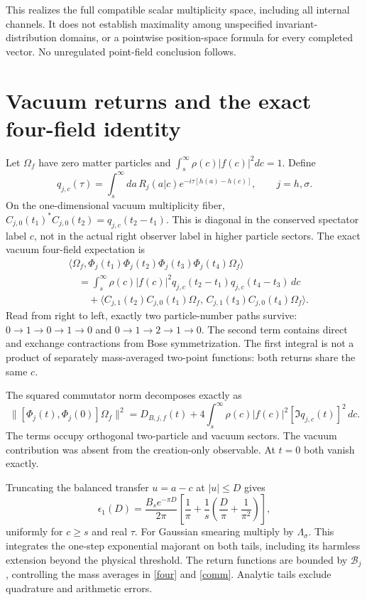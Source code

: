 \documentclass[11pt,a4paper]{article}
\begin{document}
This realizes the full compatible scalar multiplicity space, including
all internal channels. It does not establish maximality among
unspecified invariant-distribution domains, or a pointwise
position-space formula for every completed vector.
No unregulated point-field conclusion follows.

\newpage
\section{Vacuum returns and the exact four-field identity}
Let $\Omega_f$ have zero matter particles and
$\int_s^\infty\rho(c)|f(c)|^2dc=1$.
Define
\begin{equation}
 q_{j,c}(\tau)=\int_s^\infty da\,R_j(a|c)
             e^{-i\tau[h(a)-h(c)]},\qquad j=h,\sigma .
 \label{return}
\end{equation}
On the one-dimensional vacuum multiplicity fiber,
$C_{j,0}(t_1)^*C_{j,0}(t_2)=q_{j,c}(t_2-t_1)$.
This is diagonal in the conserved spectator label $c$, not in the
actual right observer label in higher particle sectors.
The exact vacuum four-field expectation is
\begin{align}
 &\langle\Omega_f,\Phi_j(t_1)\Phi_j(t_2)
                        \Phi_j(t_3)\Phi_j(t_4)\Omega_f\rangle\nonumber\\
 &\quad=\int_s^\infty\rho(c)|f(c)|^2
       q_{j,c}(t_2-t_1)q_{j,c}(t_4-t_3)\,dc\nonumber\\
 &\qquad+
 \langle C_{j,1}(t_2)C_{j,0}(t_1)\Omega_f,\,
         C_{j,1}(t_3)C_{j,0}(t_4)\Omega_f\rangle .
 \label{four}
\end{align}
Read from right to left, exactly two particle-number paths survive:
$0\to1\to0\to1\to0$ and $0\to1\to2\to1\to0$.
The second term contains direct and exchange contractions from Bose
symmetrization. The first integral is not a product of separately
mass-averaged two-point functions: both returns share the same $c$.

The squared commutator norm decomposes exactly as
\begin{equation}
 \|[\Phi_j(t),\Phi_j(0)]\Omega_f\|^2
 =D_{B,j,f}(t)+4\int_s^\infty\rho(c)|f(c)|^2
                           [\Im q_{j,c}(t)]^2\,dc .
 \label{comm}
\end{equation}
The terms occupy orthogonal two-particle and vacuum sectors.
The vacuum contribution was absent from the creation-only observable.
At $t=0$ both vanish exactly.

Truncating the balanced transfer $u=a-c$ at $|u|\le D$ gives
\begin{equation}
 \epsilon_1(D)=\frac{B_se^{-\pi D}}{2\pi}
 \left[\frac1\pi+\frac1s\left(\frac D\pi+\frac1{\pi^2}\right)\right],
 \label{onetail}
\end{equation}
uniformly for $c\ge s$ and real $\tau$.
For Gaussian smearing multiply by $\Lambda_\sigma$.
This integrates the one-step exponential majorant on both tails,
including its harmless extension beyond the physical threshold.
The return functions are bounded by $\mathcal B_j$, controlling the
mass averages in \eqref{four} and \eqref{comm}.
Analytic tails exclude quadrature and arithmetic errors.
\end{document}
